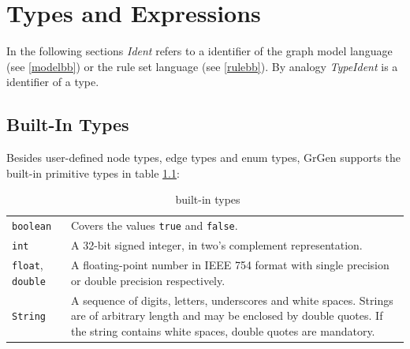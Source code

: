 \chapter{Types and Expressions}
\label{typeexpr}

In the following sections \emph{Ident} refers to a identifier of the graph model language (see \ref{modelbb}) or the rule set language (see \ref{rulebb}). By analogy \emph{TypeIdent} is a identifier of a type.

\section{Built-In Types}
\label{builtin}
Besides user-defined node types, edge types and enum types, GrGen supports the built-in primitive types in table \ref{builtintypes}:
\begin{table}[htbp]
\begin{tabularx}{\linewidth}{|l|X|}\hline
	\texttt{boolean} & Covers the values \texttt{true} and \texttt{false}. \\
	\texttt{int} & A 32-bit signed integer, in two's complement representation. \\
	\texttt{float}, \texttt{double} & A floating-point number in IEEE 754 format with single precision or double precision respectively. \\
	\texttt{String} & A sequence of digits, letters, underscores and white spaces. Strings are of arbitrary length and may be enclosed by double quotes. If the string contains white spaces, double quotes are mandatory.\\ \hline
\end{tabularx}
\caption{\GrG\ built-in types}
\label{builtintypes}
\end{table}

